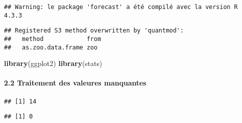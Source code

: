\documentclass[
]{article}
\newenvironment{Shaded}{\begin{snugshade}}{\end{snugshade}}
\newcommand{\CommentTok}[1]{\textcolor[rgb]{0.56,0.35,0.01}{\textit{#1}}}
\newcommand{\FunctionTok}[1]{\textcolor[rgb]{0.13,0.29,0.53}{\textbf{#1}}}
\newcommand{\NormalTok}[1]{#1}
\newcommand{\OtherTok}[1]{\textcolor[rgb]{0.56,0.35,0.01}{#1}}
\newcommand{\SpecialCharTok}[1]{\textcolor[rgb]{0.81,0.36,0.00}{\textbf{#1}}}
\begin{document}
\begin{verbatim}
## Warning: le package 'forecast' a été compilé avec la version R 4.3.3
\end{verbatim}

\begin{verbatim}
## Registered S3 method overwritten by 'quantmod':
##   method            from
##   as.zoo.data.frame zoo
\end{verbatim}

\begin{Shaded}
\begin{Highlighting}[]
\FunctionTok{library}\NormalTok{(ggplot2)}
\FunctionTok{library}\NormalTok{(stats)}
\end{Highlighting}
\end{Shaded}

\paragraph{2.2 Traitement des valeures
manquantes}\label{traitement-des-valeures-manquantes}

\begin{Shaded}
\end{Shaded}

\begin{verbatim}
## [1] 14
\end{verbatim}

\begin{Shaded}
\end{Shaded}

\begin{verbatim}
## [1] 0
\end{verbatim}

\begin{Shaded}
\end{Shaded}
\end{document}
